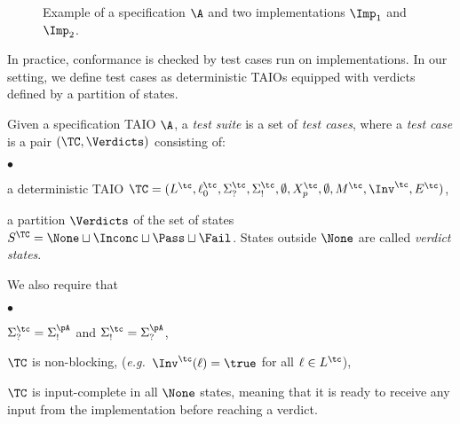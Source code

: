 \documentclass{LMCS}
\theoremstyle{plain}\newtheorem{proposition}[thm]{Proposition}
\def\eg{{\em e.g.}}
\begin{document}
\begin{center}
\begin{figure}[hbt]
{\begin{minipage}{0.45\textwidth}
\begin{center}
 \end{center}
 \end{minipage}}

 \caption{Example of a specification $\A$ and two implementations $\Imp_1$ and $\Imp_2$.}\label{imps}\end{figure}   
 \end{center}
In practice, conformance is checked by test cases run on implementations.
In our setting, we define test cases as deterministic TAIOs
equipped with verdicts defined by a partition of states.

\begin{defi}
Given a specification TAIO $\A$, 
a {\em test suite} is a set of {\em test cases},
where 
a {\em test case} is a pair $(\TC,\Verdicts)$
consisting of:
\begin{iteMize}{$\bullet$}
\item a deterministic TAIO 
$\TC=(L^\tc,\ell_0^\tc,\Sigma_?^\tc,\Sigma_!^\tc,\emptyset,X_p^\tc,\emptyset,M^\tc,\Inv^\tc,E^\tc)$,
\item a partition $\Verdicts$ of the set of states 
$S^\TC=\None \sqcup  \Inconc \sqcup \Pass \sqcup \Fail$.
States outside $\None$ are called {\em verdict states}. 
\end{iteMize} 
We also require that
\begin{iteMize}{$\bullet$}
\item 
$\Sigma_?^\tc=\Sigma_!^\pA$ and $\Sigma_!^\tc=\Sigma_?^\pA$,
\item 
$\TC$ is non-blocking, (\eg\ $\Inv^\tc(\ell)= \true$ for all $\ell \in L^\tc$),\item 
 $\TC$ is input-complete in all $\None$ states, 
meaning that it is ready to receive any input from the implementation
before reaching a verdict.
\end{iteMize}
\end{defi}\medskip
\end{document}
